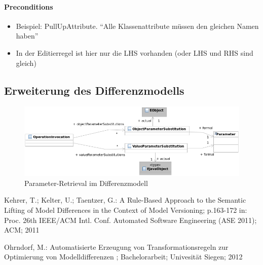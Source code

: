 \paragraph{Preconditions}
\begin{itemize}
 \item Beispiel: PullUpAttribute. ``Alle Klassenattribute müssen den gleichen Namen haben''
 \item In der Editierregel ist hier nur die LHS vorhanden (oder LHS und RHS sind gleich)
 
\end{itemize}



\subsection{Erweiterung des Differenzmodells}

\begin{figure}[htb]
  \centering
  \includegraphics[width=1.2\textwidth]{img/Parameter.png}
  \caption{Parameter-Retrieval im Differenzmodell}
  \label{fig:Parameter}
\end{figure}







\begin{thebibliography}{xx}

 {Kehrer, T.; Kelter, U.;
Taentzer, G.: A Rule-Based Approach to the Semantic
Lifting of Model Differences in the Context of Model
Versioning; p.163-172 in: Proc. 26th IEEE/ACM Intl. Conf.
Automated Software Engineering (ASE 2011); ACM; 2011}

 {Ohrndorf, M.: 
Automatisierte Erzeugung von Transformationsregeln zur 
Optimierung von Modelldifferenzen ;
Bachelorarbeit; Univesität Siegen; 2012}

\end{thebibliography}


















